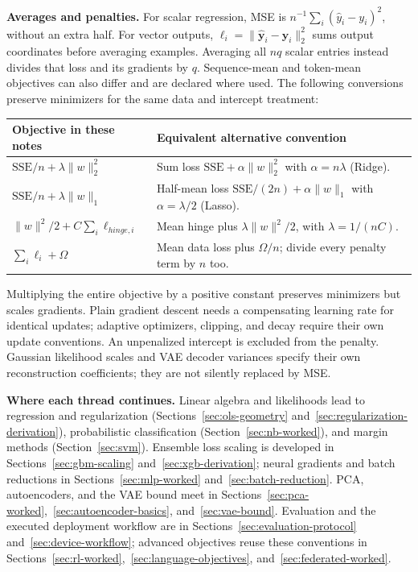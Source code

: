 \documentclass[11pt,twoside]{article}
\numberwithin{equation}{section}
\newcommand{\vect}[1]{\bm{#1}}
\theoremstyle{plain}
\theoremstyle{definition}
\theoremstyle{remark}
\begin{document}
\textbf{Averages and penalties.} For scalar regression, MSE is
$n^{-1}\sum_i(\hat y_i-y_i)^2$, without an extra half. For vector outputs,
$\ell_i=\|\hat{\vect y}_i-\vect y_i\|_2^2$ sums output coordinates before
averaging examples. Averaging all $nq$ scalar entries instead divides that
loss and its gradients by $q$. Sequence-mean and token-mean objectives can
also differ and are declared where used. The following conversions preserve
minimizers for the same data and intercept treatment:
\begin{center}\small
\begin{tabular}{@{}p{6.7cm}p{8.2cm}@{}}\toprule
Objective in these notes & Equivalent alternative convention\\\midrule
$\mathrm{SSE}/n+\lambda\|w\|_2^2$ & Sum loss $\mathrm{SSE}+\alpha\|w\|_2^2$ with $\alpha=n\lambda$ (Ridge).\\
$\mathrm{SSE}/n+\lambda\|w\|_1$ & Half-mean loss $\mathrm{SSE}/(2n)+\alpha\|w\|_1$ with $\alpha=\lambda/2$ (Lasso).\\
$\|w\|^2/2+C\sum_i\ell_{hinge,i}$ & Mean hinge plus $\lambda\|w\|^2/2$, with $\lambda=1/(nC)$.\\
$\sum_i\ell_i+\Omega$ & Mean data loss plus $\Omega/n$; divide every penalty term by $n$ too.\\\bottomrule
\end{tabular}\end{center}
Multiplying the entire objective by a positive constant preserves minimizers
but scales gradients. Plain gradient descent needs a compensating learning
rate for identical updates; adaptive optimizers, clipping, and decay require
their own update conventions. An unpenalized intercept is excluded from the
penalty. Gaussian likelihood scales and VAE decoder variances specify their
own reconstruction coefficients; they are not silently replaced by MSE.

\textbf{Where each thread continues.} Linear algebra and likelihoods lead to
regression and regularization (Sections~\ref{sec:ols-geometry}
and~\ref{sec:regularization-derivation}), probabilistic classification
(Section~\ref{sec:nb-worked}), and margin methods (Section~\ref{sec:svm}).
Ensemble loss scaling is developed in Sections~\ref{sec:gbm-scaling}
and~\ref{sec:xgb-derivation}; neural gradients and batch reductions in
Sections~\ref{sec:mlp-worked} and~\ref{sec:batch-reduction}.
PCA, autoencoders, and the VAE bound meet in
Sections~\ref{sec:pca-worked},~\ref{sec:autoencoder-basics}, and~\ref{sec:vae-bound}.
Evaluation and the executed deployment workflow are in
Sections~\ref{sec:evaluation-protocol} and~\ref{sec:device-workflow};
advanced objectives reuse these conventions in
Sections~\ref{sec:rl-worked},~\ref{sec:language-objectives}, and~\ref{sec:federated-worked}.
\end{document}
